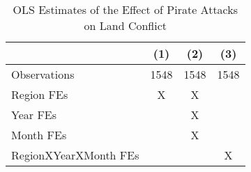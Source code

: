 \begin{table}[htbp]\centering
\def\sym#1{\ifmmode^{#1}\else\(^{#1}\)\fi}
\caption{OLS Estimates of the Effect of Pirate Attacks on Land Conflict\label{TableOLSPoissonEstimates}}
\begin{tabular}{l*{3}{c}}
\toprule
                    &\multicolumn{1}{c}{(1)}   &\multicolumn{1}{c}{(2)}   &\multicolumn{1}{c}{(3)}   \\
\midrule
\midrule
Observations        &        1548   &        1548   &        1548   \\
Region FEs          &           X   &           X   &               \\
Year FEs            &               &           X   &               \\
Month FEs           &               &           X   &               \\
RegionXYearXMonth FEs&               &               &           X   \\
\bottomrule
\end{tabular}
\end{table}

